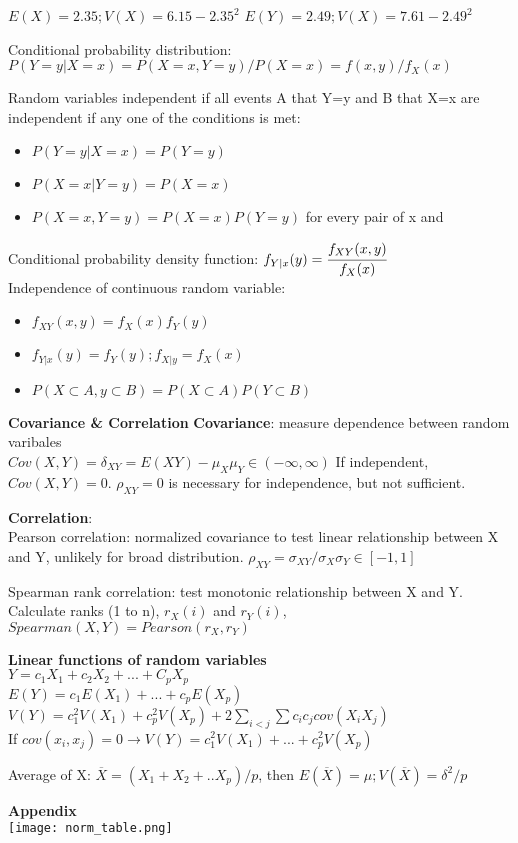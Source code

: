 \documentclass[a4paper,10pt]{article}
\begin{document}
\begin{multicols}{2}
$E(X)=2.35;V(X)=6.15-2.35^2$
$E(Y)=2.49;V(X)=7.61-2.49^2$

Conditional probability distribution: 
$P(Y=y|X=x)=P(X=x,Y=y)/P(X=x)=f(x,y)/f_X(x)$

Random variables independent if all events A that Y=y and B that X=x are independent if any one of the conditions is met:\\
\begin{itemize}
    \item $P(Y=y|X=x)=P(Y=y)$
    \item $P(X=x|Y=y)=P(X=x)$
    \item $P(X=x,Y=y)=P(X=x)P(Y=y)$ for every pair of x and 
\end{itemize}

Conditional probability density function: $f_{Y|x}(y)=\cfrac{f_{XY}(x,y)}{f_X(x)}$\\
Independence of continuous random variable:
\begin{itemize}
\item $f_{XY}(x,y)=f_X(x)f_Y(y)$
\item $f_{Y|x}(y)=f_Y(y); f_{X|y}=f_X(x)$
\item $P(X\subset A,y\subset B)=P(X\subset A)P(Y\subset B)$
\end{itemize}

\textbf{Covariance \& Correlation}
\textbf{Covariance}: measure dependence between random varibales\\
$Cov(X,Y)=\delta_{XY}=E(XY)-\mu_X\mu_Y\in (-\infty,\infty)$
If independent, $Cov(X,Y)=0$. $\rho_{XY}=0$ is necessary for independence, but not sufficient. 

\textbf{Correlation}: \\
Pearson correlation: normalized covariance to test linear relationship between X and Y, unlikely for broad distribution.
$\rho_{XY}=\sigma_{XY}/\sigma_X\sigma_Y\in [-1,1]$

Spearman rank correlation: test monotonic relationship between X and Y. 
Calculate ranks (1 to n), $r_X(i)$ and $r_Y(i)$, $Spearman(X,Y)=Pearson(r_X,r_Y)$

\textbf{Linear functions of random variables}\\
$Y=c_1X_1+c_2X_2+...+C_pX_p$\\
$E(Y)=c_1E(X_1)+...+c_pE(X_p)$\\
$V(Y)=c_1^2V(X_1)+c_p^2V(X_p)+2\sum_{i<j}\sum c_ic_jcov(X_iX_j)$\\
If $cov(x_i,x_j)=0\rightarrow V(Y)=c_1^2V(X_1)+...+c_p^2V(X_p)$

Average of X: $\overline X=(X_1+X_2+..X_p)/p$, then $E(\overline X)=\mu;V(\overline X)=\delta^2/p$

\end{multicols}

\textbf{Appendix}\\
\texttt{[image: norm\_table.png]}
\end{document}
